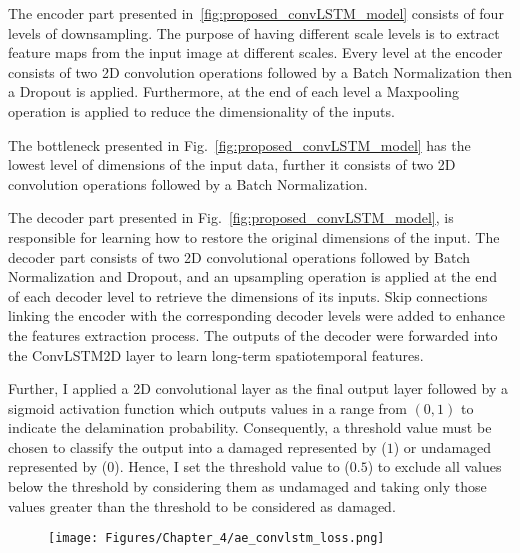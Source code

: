 The encoder part presented in~\ref{fig:proposed_convLSTM_model} consists of four levels of downsampling. 
The purpose of having different scale levels is to extract feature maps from the input image at different scales.
Every level at the encoder consists of two 2D convolution operations followed by a Batch Normalization then a Dropout is applied. 
Furthermore, at the end of each level a Maxpooling operation is applied to reduce the dimensionality of the inputs. 

The bottleneck presented in Fig.~\ref{fig:proposed_convLSTM_model} has the lowest level of dimensions of the input data, further it consists of two 2D convolution operations followed by a Batch Normalization.

The decoder part presented in Fig.~\ref{fig:proposed_convLSTM_model}, is responsible for learning how to restore the original dimensions of the input.
The decoder part consists of two 2D convolutional operations followed by Batch Normalization and Dropout, and an upsampling operation is applied at the end of each decoder level to retrieve the dimensions of its inputs.
Skip connections linking the encoder with the corresponding decoder levels were added to enhance the features extraction process.
The outputs of the decoder were forwarded into the ConvLSTM2D layer to learn long-term spatiotemporal features.

Further, I applied a 2D convolutional layer as the final output layer followed by a sigmoid activation function which outputs values in a range from \((0,1)\) to indicate the delamination probability.
Consequently, a threshold value must be chosen to classify the output into a damaged represented by (\(1\)) or undamaged represented by (\(0\)).
Hence, I set the threshold value to (\(0.5\)) to exclude all values below the threshold by considering them as undamaged and taking only those values greater than the threshold to be considered as damaged.

\begin{figure}[!h]
	\centering
	\texttt{[image: Figures/Chapter\_4/ae\_convlstm\_loss.png]}
	\caption{}
	\label{fig:ae_convlstm_loss}
\end{figure}


\clearpage